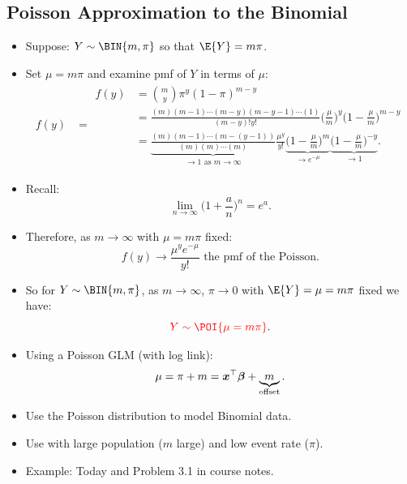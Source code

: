 \documentclass{article}\usepackage[]{graphicx}\usepackage[svgnames]{xcolor}
\let\log\relax%
\providecommand{\Vector}[1]{\bm{#1}}%
\begin{document}
\subsection*{Poisson Approximation to the Binomial}
\begin{itemize}
    \item Suppose: \textcolor{Red}{$Y \sim \BIN{m,\pi}$} so that $ \E{Y}=m\pi $.
    \item Set $ \mu=m\pi $ and examine pmf of $ Y $ in terms of $ \mu $:
          \begin{align*}
              f(y)
               & =\begin{aligned}
                      f(y) & =\binom{m}{y} \pi^{y}(1-\pi)^{m-y}                                                                                           \\
                           & =\frac{(m)(m-1) \cdots(m-y)(m-y-1) \cdots(1)}{(m-y) ! y !}\biggl(\frac{\mu}{m}\biggr)^{y}\biggl(1-\frac{\mu}{m}\biggr)^{m-y} \\
                           & =\underbrace{\frac{(m)(m-1) \cdots(m-(y-1))}{(m)(m) \cdots(m)}}_{\to 1 \text{ as } m \to \infty} \frac{\mu^{y}}{y !}
                      \underbrace{\biggr(1-\frac{\mu}{m}\biggr)^{m}}_{\to e^{-\mu}} \underbrace{\biggl(1-\frac{\mu}{m}\biggr)^{-y}}_{\to 1}.
                  \end{aligned}
          \end{align*}
    \item Recall:
          \[ \lim\limits_{{n} \to {\infty}}\biggl(1+\frac{a}{n}\biggr)^{\!n}=e^a. \]
    \item Therefore, as $ m\to\infty $ with $ \mu=m\pi $ fixed:
          \[ f(y)\to \frac{\mu^y e^{-\mu}}{y!}\text{ the pmf of the Poisson.} \]
    \item So for $ Y \sim \BIN{m,\pi} $, as $ m\to\infty $, $ \pi\to 0 $ with $ \E{Y}=\mu=m\pi $ fixed we have:
          \[ \textcolor{Red}{Y \sim \POI{\mu=m\pi}}. \]
    \item Using a Poisson GLM (with log link):
          \[ \log{\mu}=\log{\pi}+\log{m}=\Vector{x}^\top \Vector{\beta}+\underbrace{\log{m}}_\text{offset}. \]
    \item Use the Poisson distribution to model Binomial data.
    \item Use with large population ($m$ large) and low event rate ($ \pi $).
    \item Example: Today and Problem 3.1 in course notes.
\end{itemize}
\end{document}
